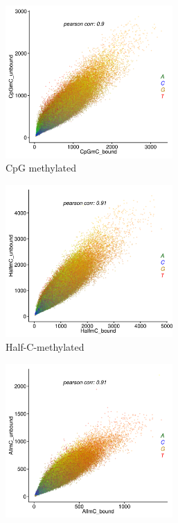 \documentclass[parskip=full, numbers=noenddot]{scrreprt}
\begin{document}
\begin{figure}[htpb]
  \centering
  \begin{subfigure}[htpb]{0.7\textwidth}
    \centering
    \includegraphics[width=0.7\textwidth]{kmer_CpGubXCpGb}
    \caption{CpG methylated}
    \label{fig:kmer_bound_cpg}
  \end{subfigure}
  \begin{subfigure}[htpb]{0.7\textwidth}
    \centering
    \includegraphics[width=0.7\textwidth]{kmer_halfubXhalfb}
    \caption{Half-C-methylated}
    \label{fig:kmer_bound_half}
  \end{subfigure}
  \begin{subfigure}[htpb]{0.7\textwidth}
    \centering
    \includegraphics[width=0.7\textwidth]{kmer_allubXallb}

\end{subfigure}
\end{figure}
\end{document}
